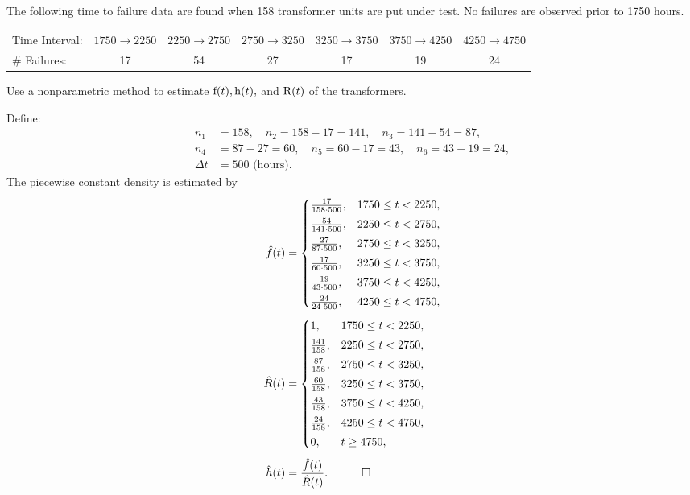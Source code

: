\begin{hwkProblem}{2}{}

	The following time to failure data are found when 158 transformer units are put under test. No failures are observed prior to 1750 hours.
	\begin{center}
		\begin{tabular}{lcccccc}
			Time Interval: & \( 1750 \to 2250 \) & \( 2250 \to 2750 \) & \( 2750 \to 3250 \) & \( 3250 \to 3750 \) & \( 3750 \to 4250 \) & \( 4250 \to 4750 \) \\
			\# Failures: & 17 & 54 & 27 & 17 & 19 & 24
		\end{tabular}
	\end{center}
	Use a nonparametric method to estimate \( \func{f}[t], \func{h}[t], \) and \( \func{R}[t] \) of the transformers.

	\hwkSol

	Define:
	\begin{align*}
		n_1 &= 158,\quad n_2 = 158 - 17 = 141,\quad n_3 = 141 - 54 = 87,\\[1mm]
		n_4 &= 87 - 27 = 60,\quad n_5 = 60 - 17 = 43,\quad n_6 = 43 - 19 = 24,\\[1mm]
		\Delta t &= 500 \text{ (hours)}.
	\end{align*}
	The piecewise constant density is estimated by
	\begin{align*}
		\hat{f}(t) &= \begin{cases}
			\frac{17}{158\cdot500}, & 1750\le t<2250,\\[1mm]
			\frac{54}{141\cdot500}, & 2250\le t<2750,\\[1mm]
			\frac{27}{87\cdot500},  & 2750\le t<3250,\\[1mm]
			\frac{17}{60\cdot500},  & 3250\le t<3750,\\[1mm]
			\frac{19}{43\cdot500},  & 3750\le t<4250,\\[1mm]
			\frac{24}{24\cdot500},  & 4250\le t<4750,
		\end{cases}\\[1mm]
		\hat{R}(t) &= \begin{cases}
			1, & 1750\le t<2250,\\[1mm]
			\frac{141}{158}, & 2250\le t<2750,\\[1mm]
			\frac{87}{158}, & 2750\le t<3250,\\[1mm]
			\frac{60}{158}, & 3250\le t<3750,\\[1mm]
			\frac{43}{158}, & 3750\le t<4250,\\[1mm]
			\frac{24}{158}, & 4250\le t<4750,\\[1mm]
			0, & t\ge4750,
		\end{cases}\\[1mm]
		\hat{h}(t) &= \frac{\hat{f}(t)}{\hat{R}(t)}. \quad \qed
	\end{align*}

\end{hwkProblem}


